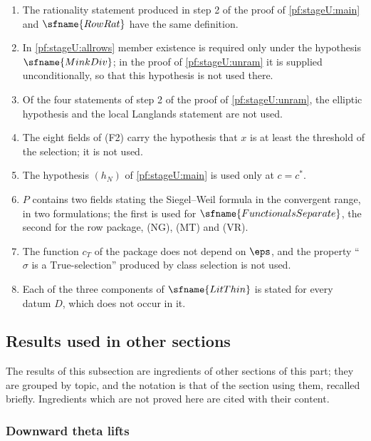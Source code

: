 \begin{remark}\label{pf:stageU:rem}
\begin{enumerate}[label=(\arabic*)]
\item The rationality statement produced in step 2 of the proof of \cref{pf:stageU:main} and $\sfname{RowRat}$ have the same
definition.
\item In \cref{pf:stageU:allrows} member existence is required only under the hypothesis $\sfname{MinkDiv}$; in the proof of
\cref{pf:stageU:unram} it is supplied unconditionally, so that this hypothesis is not used there.
\item Of the four statements of step 2 of the proof of \cref{pf:stageU:unram}, the elliptic hypothesis and the local
Langlands statement are not used.
\item The eight fields of (F2) carry the hypothesis that $x$ is at least the threshold of the selection; it is not used.
\item The hypothesis $(h_N)$ of \cref{pf:stageU:main} is used only at $c=c^*$.
\item $P$ contains two fields stating the Siegel--Weil formula in the convergent range, in two formulations; the first is used
for $\sfname{FunctionalsSeparate}$, the second for the row package, (NG), (MT) and (VR).
\item The function $c_T$ of the package does not depend on $\eps$, and the property ``$\sigma$ is a $\mathrm{True}$-selection''
produced by class selection is not used.
\item Each of the three components of $\sfname{LitThin}$ is stated for every datum $D$, which does not occur in it.
\end{enumerate}
\end{remark}

\subsection{Results used in other sections}\label{sec:pf:stageU:other}

The results of this subsection are ingredients of other sections of this part; they are grouped by topic, and the
notation is that of the section using them, recalled briefly. Ingredients which are not proved here are cited with
their content.

\subsubsection{Downward theta lifts}\label{sec:pf:stageU:down}

